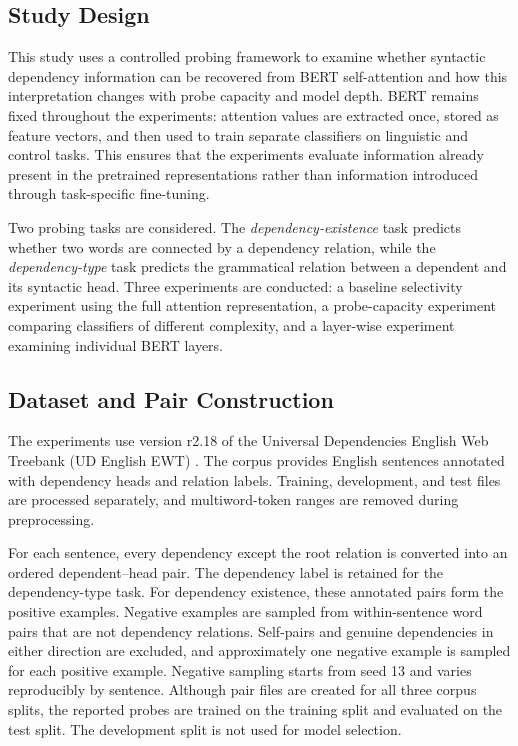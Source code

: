 \documentclass[12pt,a4paper]{article}
\begin{document}
\subsection{Study Design}

This study uses a controlled probing framework to examine whether syntactic dependency information can be recovered from BERT self-attention and how this interpretation changes with probe capacity and model depth. BERT remains fixed throughout the experiments: attention values are extracted once, stored as feature vectors, and then used to train separate classifiers on linguistic and control tasks. This ensures that the experiments evaluate information already present in the pretrained representations rather than information introduced through task-specific fine-tuning.

Two probing tasks are considered. The \emph{dependency-existence} task predicts whether two words are connected by a dependency relation, while the \emph{dependency-type} task predicts the grammatical relation between a dependent and its syntactic head. Three experiments are conducted: a baseline selectivity experiment using the full attention representation, a probe-capacity experiment comparing classifiers of different complexity, and a layer-wise experiment examining individual BERT layers.

\subsection{Dataset and Pair Construction}

The experiments use version r2.18 of the Universal Dependencies English Web Treebank (UD English EWT) \cite{silveira2014gold}. The corpus provides English sentences annotated with dependency heads and relation labels. Training, development, and test files are processed separately, and multiword-token ranges are removed during preprocessing.

For each sentence, every dependency except the root relation is converted into an ordered dependent--head pair. The dependency label is retained for the dependency-type task. For dependency existence, these annotated pairs form the positive examples. Negative examples are sampled from within-sentence word pairs that are not dependency relations. Self-pairs and genuine dependencies in either direction are excluded, and approximately one negative example is sampled for each positive example. Negative sampling starts from seed 13 and varies reproducibly by sentence. Although pair files are created for all three corpus splits, the reported probes are trained on the training split and evaluated on the test split. The development split is not used for model selection.
\end{document}
